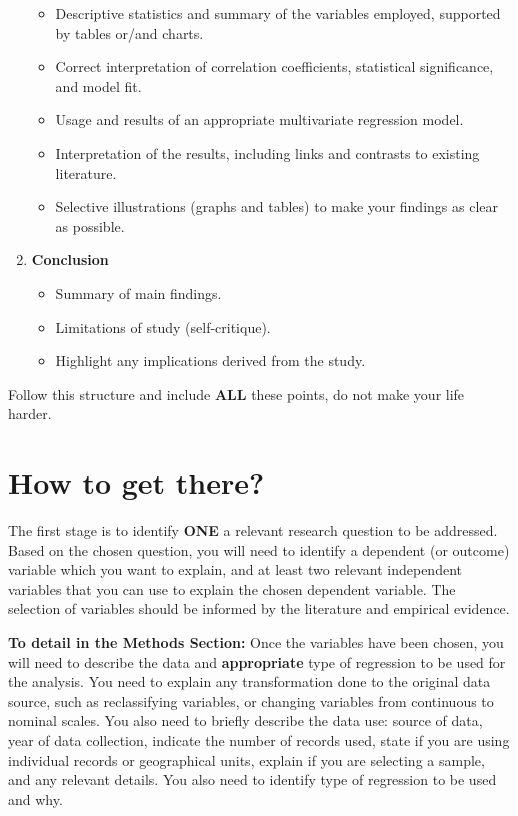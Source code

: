 \documentclass[
  letterpaper,
  DIV=11,
  numbers=noendperiod]{scrreprt}
\providecommand{\tightlist}{%
  \setlength{\itemsep}{0pt}\setlength{\parskip}{0pt}}\usepackage{longtable,booktabs,array}
\begin{document}
\begin{enumerate}
  \begin{itemize}
  \tightlist
  \item
    Descriptive statistics and summary of the variables employed,
    supported by tables or/and charts.
  \item
    Correct interpretation of correlation coefficients, statistical
    significance, and model fit.
  \item
    Usage and results of an appropriate multivariate regression model.
  \item
    Interpretation of the results, including links and contrasts to
    existing literature.
  \item
    Selective illustrations (graphs and tables) to make your findings as
    clear as possible.
  \end{itemize}
\item
  \textbf{Conclusion}

  \begin{itemize}
  \tightlist
  \item
    Summary of main findings.
  \item
    Limitations of study (self-critique).
  \item
    Highlight any implications derived from the study.
  \end{itemize}
\end{enumerate}

Follow this structure and include \textbf{ALL} these points, do not make
your life harder.

\section*{How to get there?}\label{how-to-get-there}


The first stage is to identify \textbf{ONE} a relevant research question
to be addressed. Based on the chosen question, you will need to identify
a dependent (or outcome) variable which you want to explain, and at
least two relevant independent variables that you can use to explain the
chosen dependent variable. The selection of variables should be informed
by the literature and empirical evidence.

\textbf{To detail in the Methods Section:} Once the variables have been
chosen, you will need to describe the data and \textbf{appropriate} type
of regression to be used for the analysis. You need to explain any
transformation done to the original data source, such as reclassifying
variables, or changing variables from continuous to nominal scales. You
also need to briefly describe the data use: source of data, year of data
collection, indicate the number of records used, state if you are using
individual records or geographical units, explain if you are selecting a
sample, and any relevant details. You also need to identify type of
regression to be used and why.
\end{document}
